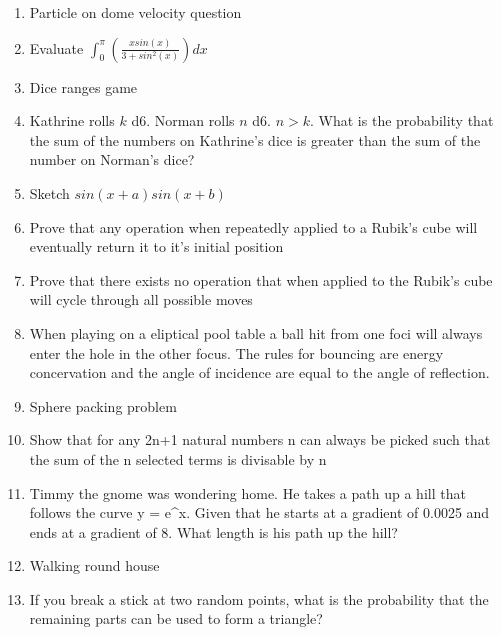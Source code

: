 \documentclass[a4paper]{article}
\begin{document}
\begin{enumerate}
\item
Particle on dome velocity question

\item
Evaluate
$\int_{0}^{\pi}(\frac{xsin(x)}{3 + sin^2(x)})dx$

\item
Dice ranges game

\item
Kathrine rolls $k$ d6. Norman rolls $n$ d6. $n > k$. What is the probability that the sum of the numbers on Kathrine's dice is greater than the sum of the number on Norman's dice?

\item
Sketch $sin(x+a)sin(x+b)$

\item
Prove that any operation when repeatedly applied to a Rubik's cube will eventually return it to it's initial position

\item
Prove that there exists no operation that when applied to the Rubik's cube will cycle through all possible moves

\item
When playing on a eliptical pool table a ball hit from one foci will always enter the hole in the other focus. The rules for bouncing are energy concervation and the angle of incidence are equal to the angle of reflection.

\item
Sphere packing problem

\item
Show that for any 2n+1 natural numbers n can always be picked such that the sum of the n selected terms is divisable by n

\item
Timmy the gnome was wondering home. He takes a path up a hill that follows the curve y = e^x. Given that he starts at a gradient of 0.0025 and ends at a gradient of 8. What length is his path up the hill?

\item
Walking round house

\item
If you break a stick at two random points, what is the probability that the remaining parts can be used to form a triangle?

\end{enumerate}
\end{document}
